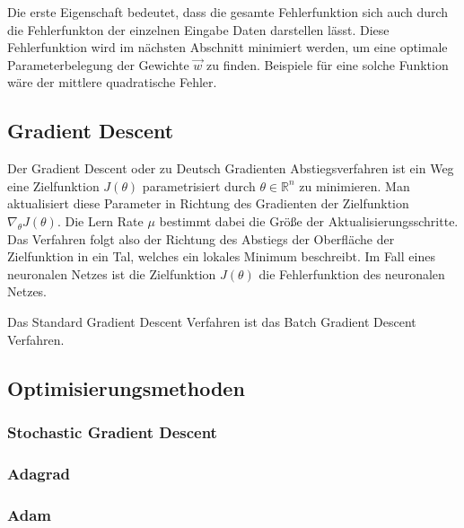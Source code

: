 Die erste Eigenschaft bedeutet, dass die gesamte Fehlerfunktion 
sich auch durch die Fehlerfunkton der einzelnen Eingabe Daten darstellen lässt.
Diese Fehlerfunktion wird im nächsten Abschnitt minimiert werden, um
eine optimale Parameterbelegung der Gewichte $\vec{w}$ zu finden. 
Beispiele für eine solche Funktion wäre der 
mittlere quadratische Fehler.

\subsection{Gradient Descent}\label{Gradient Descent}

Der Gradient Descent oder zu Deutsch Gradienten Abstiegsverfahren
ist ein Weg eine Zielfunktion $J(\theta)$ parametrisiert durch $\theta \in \mathbb{R}^n$
zu minimieren. Man aktualisiert diese Parameter in Richtung des Gradienten
der Zielfunktion $\nabla_\theta J(\theta)$. Die Lern Rate $\mu$ bestimmt
dabei die Größe der Aktualisierungsschritte. Das Verfahren folgt 
also der Richtung des Abstiegs der Oberfläche der Zielfunktion in ein Tal,
welches ein lokales Minimum
beschreibt. \cite{Ruder.9152016} 
Im Fall eines neuronalen Netzes ist die Zielfunktion $J(\theta)$ die
Fehlerfunktion des neuronalen Netzes. 

Das Standard Gradient Descent Verfahren ist das Batch Gradient Descent Verfahren.



\subsection{Optimisierungsmethoden}\label{Optimisierungsmethoden}

\subsubsection{Stochastic Gradient Descent}\label{Stochastic Gradient Descent}

\subsubsection{Adagrad}\label{Adagrad}

\subsubsection{Adam}\label{Adam}